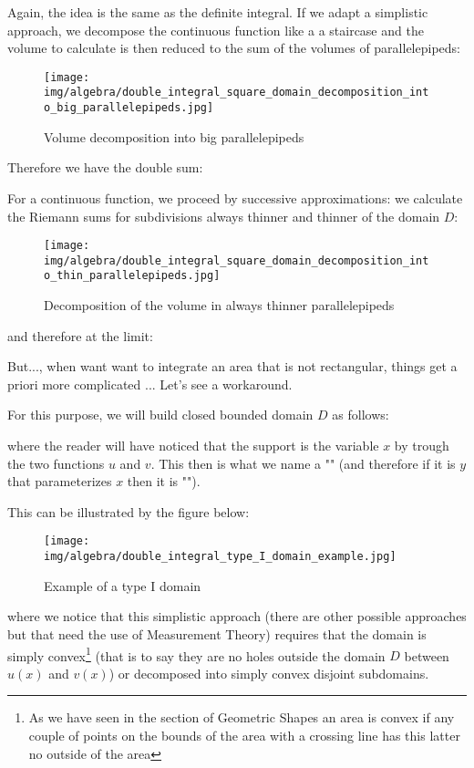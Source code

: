 	Again, the idea is the same as the definite integral. If we adapt a simplistic approach, we decompose the continuous function like a a staircase and the volume to calculate is then reduced to the sum of the volumes of parallelepipeds:
		
	\begin{figure}[H]
		\centering
		\texttt{[image: img/algebra/double\_integral\_square\_domain\_decomposition\_into\_big\_parallelepipeds.jpg]}
		\caption{Volume decomposition into big parallelepipeds}
	\end{figure}
	Therefore we have the double sum:
	
	For a continuous function, we proceed by successive approximations: we calculate the Riemann sums for subdivisions always thinner and thinner of the domain $D$:
	\begin{figure}[H]
		\centering
		\texttt{[image: img/algebra/double\_integral\_square\_domain\_decomposition\_into\_thin\_parallelepipeds.jpg]}
		\caption{Decomposition of the volume in always thinner parallelepipeds}
	\end{figure}
	and therefore at the limit:
	
	But..., when want want to integrate an area that is not rectangular, things get a priori more complicated ... Let's see a workaround.
	
	For this purpose, we will build closed bounded domain $D$ as follows:
	
	where the reader will have noticed that the support is the variable $x$ by trough the two functions $u$ and $v$. This then is what we name a "" (and therefore if it is $y$ that parameterizes $x$ then it is "").

	This can be illustrated by the figure below:
	\begin{figure}[H]
		\centering
		\texttt{[image: img/algebra/double\_integral\_type\_I\_domain\_example.jpg]}
		\caption{Example of a type I domain}
	\end{figure}
	where we notice that this simplistic approach (there are other possible approaches but that need the use of Measurement Theory) requires that the domain is simply convex\footnote{As we have seen in the section of Geometric Shapes an area is convex if any couple of points on the bounds of the area with a crossing line has this latter no outside of the area} (that is to say they are no holes outside the domain $D$ between $u (x)$ and $v (x)$) or decomposed into simply convex disjoint subdomains.

